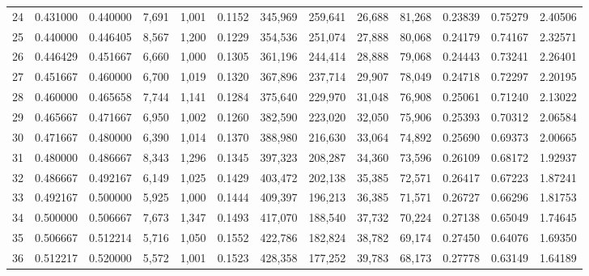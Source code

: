 \begin{tabular}{rrrrrrrrrrrrr}
24 &  0.431000 &  0.440000 &   7,691 &  1,001 &                                     0.1152 &  345,969 &  259,641 &   26,688 &   81,268 &  0.23839 &  0.75279 &  2.40506 \\
25 &  0.440000 &  0.446405 &   8,567 &  1,200 &                                     0.1229 &  354,536 &  251,074 &   27,888 &   80,068 &  0.24179 &  0.74167 &  2.32571 \\
26 &  0.446429 &  0.451667 &   6,660 &  1,000 &                                     0.1305 &  361,196 &  244,414 &   28,888 &   79,068 &  0.24443 &  0.73241 &  2.26401 \\
27 &  0.451667 &  0.460000 &   6,700 &  1,019 &                                     0.1320 &  367,896 &  237,714 &   29,907 &   78,049 &  0.24718 &  0.72297 &  2.20195 \\
28 &  0.460000 &  0.465658 &   7,744 &  1,141 &                                     0.1284 &  375,640 &  229,970 &   31,048 &   76,908 &  0.25061 &  0.71240 &  2.13022 \\
29 &  0.465667 &  0.471667 &   6,950 &  1,002 &                                     0.1260 &  382,590 &  223,020 &   32,050 &   75,906 &  0.25393 &  0.70312 &  2.06584 \\
30 &  0.471667 &  0.480000 &   6,390 &  1,014 &                                     0.1370 &  388,980 &  216,630 &   33,064 &   74,892 &  0.25690 &  0.69373 &  2.00665 \\
31 &  0.480000 &  0.486667 &   8,343 &  1,296 &                                     0.1345 &  397,323 &  208,287 &   34,360 &   73,596 &  0.26109 &  0.68172 &  1.92937 \\
32 &  0.486667 &  0.492167 &   6,149 &  1,025 &                                     0.1429 &  403,472 &  202,138 &   35,385 &   72,571 &  0.26417 &  0.67223 &  1.87241 \\
33 &  0.492167 &  0.500000 &   5,925 &  1,000 &                                     0.1444 &  409,397 &  196,213 &   36,385 &   71,571 &  0.26727 &  0.66296 &  1.81753 \\
34 &  0.500000 &  0.506667 &   7,673 &  1,347 &                                     0.1493 &  417,070 &  188,540 &   37,732 &   70,224 &  0.27138 &  0.65049 &  1.74645 \\
35 &  0.506667 &  0.512214 &   5,716 &  1,050 &                                     0.1552 &  422,786 &  182,824 &   38,782 &   69,174 &  0.27450 &  0.64076 &  1.69350 \\
36 &  0.512217 &  0.520000 &   5,572 &  1,001 &                                     0.1523 &  428,358 &  177,252 &   39,783 &   68,173 &  0.27778 &  0.63149 &  1.64189 \\

\end{tabular}
